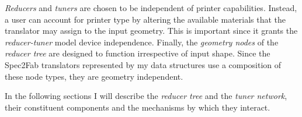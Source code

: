 	\emph{Reducers} and \emph{tuners} are chosen to be independent of printer capabilities. 
	Instead, a user can account for printer type by altering the available materials that the translator may assign to the input geometry.  This is important since it grants the \emph{reducer-tuner} model  device independence. Finally, the \emph{geometry nodes} of the \emph{reducer tree} are designed to function irrespective of input shape. Since the Spec2Fab translators represented by my data structures use a composition of these node types, they are geometry independent. 
	
	In the following sections I will describe the \emph{reducer tree} and the \emph{tuner network}, their constituent components and the mechanisms by which they interact. 
